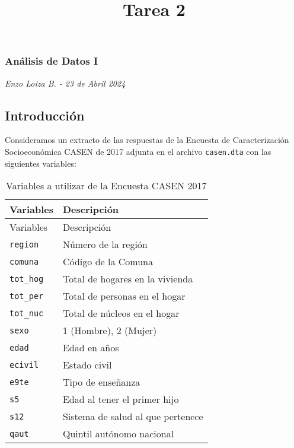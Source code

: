 \documentclass[
]{article}
\title{Tarea 2}
\author{}
\date{\vspace{-2.5em}}
\begin{document}
\maketitle

\hypertarget{anuxe1lisis-de-datos-i}{%
\subsubsection{Análisis de Datos I}\label{anuxe1lisis-de-datos-i}}

\emph{Enzo Loiza B. - 23 de Abril 2024}

\hypertarget{introducciuxf3n}{%
\subsection{Introducción}\label{introducciuxf3n}}

Consideramos un extracto de las respuestas de la Encuesta de
Caracterización Socioeconómica CASEN de 2017 adjunta en el archivo
\texttt{casen.dta} con las siguientes variables:

\begin{longtable}[]{@{}ll@{}}
\caption{Variables a utilizar de la Encuesta CASEN 2017}\tabularnewline
\toprule\noalign{}
Variables & Descripción \\
\midrule\noalign{}
\endfirsthead
\toprule\noalign{}
Variables & Descripción \\
\midrule\noalign{}
\endhead
\bottomrule\noalign{}
\endlastfoot
\texttt{region} & Número de la región \\
\texttt{comuna} & Código de la Comuna \\
\texttt{tot\_hog} & Total de hogares en la vivienda \\
\texttt{tot\_per} & Total de personas en el hogar \\
\texttt{tot\_nuc} & Total de núcleos en el hogar \\
\texttt{sexo} & 1 (Hombre), 2 (Mujer) \\
\texttt{edad} & Edad en años \\
\texttt{ecivil} & Estado civil \\
\texttt{e9te} & Tipo de enseñanza \\
\texttt{s5} & Edad al tener el primer hijo \\
\texttt{s12} & Sistema de salud al que pertenece \\
\texttt{qaut} & Quintil autónomo nacional \\
\end{longtable}
\end{document}
